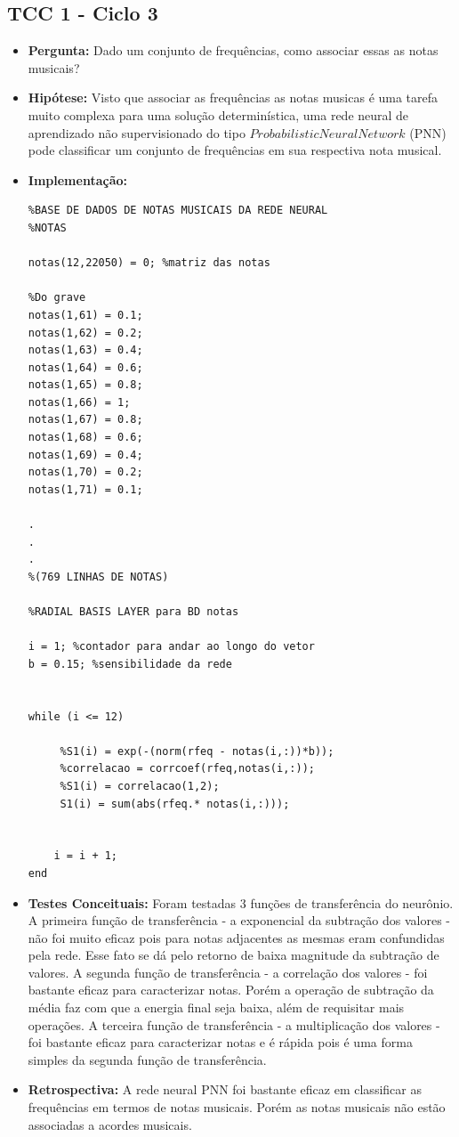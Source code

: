 \subsection{TCC 1 - Ciclo 3}
\begin{itemize}
\item \textbf{Pergunta:} Dado um conjunto de frequências, como associar essas as notas musicais?
\item \textbf{Hipótese:} Visto que associar as frequências as notas musicas é uma tarefa muito complexa para uma solução determinística, uma rede neural de aprendizado não supervisionado do tipo $Probabilistic Neural Network$ (PNN) pode classificar um conjunto de frequências em sua respectiva nota musical.
\item \textbf{Implementação:} 
\begin{lstlisting}
%BASE DE DADOS DE NOTAS MUSICAIS DA REDE NEURAL
%NOTAS

notas(12,22050) = 0; %matriz das notas

%Do grave
notas(1,61) = 0.1;
notas(1,62) = 0.2;
notas(1,63) = 0.4;
notas(1,64) = 0.6;
notas(1,65) = 0.8;
notas(1,66) = 1;
notas(1,67) = 0.8;
notas(1,68) = 0.6;
notas(1,69) = 0.4;
notas(1,70) = 0.2;
notas(1,71) = 0.1;

.
.
.
%(769 LINHAS DE NOTAS)

%RADIAL BASIS LAYER para BD notas

i = 1; %contador para andar ao longo do vetor
b = 0.15; %sensibilidade da rede


while (i <= 12)
    
     %S1(i) = exp(-(norm(rfeq - notas(i,:))*b));
     %correlacao = corrcoef(rfeq,notas(i,:));
     %S1(i) = correlacao(1,2);    
     S1(i) = sum(abs(rfeq.* notas(i,:)));
    

    i = i + 1;
end

\end{lstlisting}
\item \textbf{Testes Conceituais:} Foram testadas 3 funções de transferência do neurônio. A primeira função de transferência - a exponencial da subtração dos valores - não foi muito eficaz pois para notas adjacentes as mesmas eram confundidas pela rede. Esse fato se dá pelo retorno de baixa magnitude da subtração de valores. A segunda função de transferência - a correlação dos valores - foi bastante eficaz para caracterizar notas. Porém a operação de subtração da média faz com que a energia final seja baixa, além de requisitar mais operações. A terceira função de transferência - a multiplicação dos valores - foi bastante eficaz para caracterizar notas e é rápida pois é uma forma simples da segunda função de transferência.
\item \textbf{Retrospectiva:} A rede neural PNN foi bastante eficaz em classificar as frequências em termos de notas musicais. Porém as notas musicais não estão associadas a acordes musicais.
\end{itemize}

